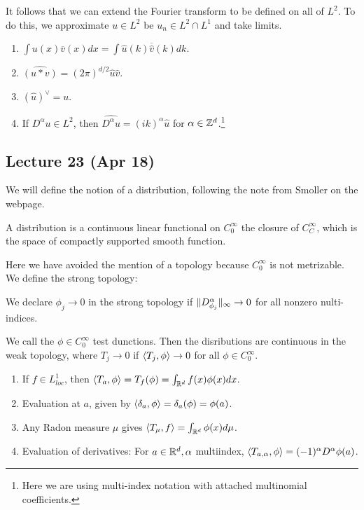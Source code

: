 \documentclass[10pt, twoside]{article}
\begin{document}
    It follows that we can extend the Fourier transform to be defined on all of $L^2$. To do this, we approximate $u \in L^2$ be $u_n \in L^2 \cap L^1$ and take limits.

    \begin{prop}
        \begin{enumerate}
            \item $\int u(x)\overline{v}(x) dx = \int \widehat{u}(k) \overline{\widehat{v}}(k) dk$.
            \item $\widehat{(u * v)} = (2\pi)^{d/2} \widehat{u} \widehat{v}$.
            \item $(\widehat{u})^{\vee} = u$.
            \item If $D^{\alpha} u \in L^2$, then $\widehat{D^{\alpha} u} = (ik)^{\alpha} \widehat{u}$ for $\alpha \in \mathbb{Z}^d$.\footnote{Here we are using multi-index notation with attached multinomial coefficients.}
        \end{enumerate}
    \end{prop}

    \subsection{Lecture 23 (Apr 18)}
    We will define the notion of a distribution, following the note from Smoller on the webpage.

    \begin{defn}[Distribution]
        A distribution is a continuous linear functional on $C^{\infty}_0$ the closure of $C^{\infty}_C$, which is the space of compactly supported smooth function.
    \end{defn}

    Here we have avoided the mention of a topology because $C^{\infty}_0$ is not metrizable. We define the strong topology:

    \begin{defn}
        We declare $\phi_j \to 0$ in the strong topology if $\lVert D^{\alpha}_{\phi_j}\rVert_{\infty} \to 0$ for all nonzero nulti-indices.
    \end{defn}
       
    We call the $\phi \in C_0^{\infty}$ test dunctions. Then the disributions are continuous in the weak topology, where $T_j \to 0$ if $\langle T_j,\phi\rangle \to 0$ for all $\phi \in C_0^{\infty}$.

    \begin{exm}
        \begin{enumerate}
            \item If $f \in L^1_{loc}$, then $\langle T_a,\phi\rangle = T_f(\phi) = \int_{\mathbb{R}^d} f(x) \phi(x) dx$.
            \item Evaluation at $a$, given by $\langle\delta_a,\phi\rangle = \delta_a(\phi) = \phi(a)$.
            \item Any Radon measure $\mu$ gives $\langle T_{\mu},f\rangle = \int_{\mathbb{R}^d} \phi(x) d \mu$.
            \item Evaluation of derivatives: For $a \in \mathbb{R}^d, \alpha$ multiindex, $\langle T_{a,\alpha},\phi\rangle = (-1)^{\alpha} D^{\alpha}\phi(a)$.
        \end{enumerate}
    \end{exm}
\end{document}
